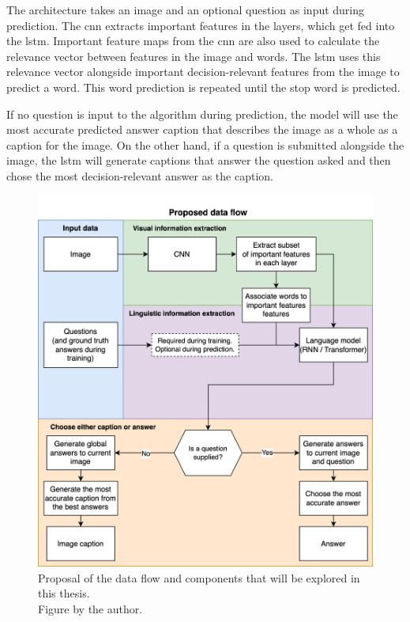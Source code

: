         The architecture takes an image and an optional question as input during prediction. The \gls{cnn} extracts important features in the layers, which get fed into the \gls{lstm}. Important feature maps from the \gls{cnn} are also used to calculate the relevance vector between features in the image and words. The \gls{lstm} uses this relevance vector alongside important decision-relevant features from the image to predict a word. This word prediction is repeated until the stop word is predicted. 
        
        If no question is input to the algorithm during prediction, the model will use the most accurate predicted answer caption that describes the image as a whole as a caption for the image. On the other hand, if a question is submitted alongside the image, the \gls{lstm} will generate captions that answer the question asked and then chose the most decision-relevant answer as the caption. 
        
        
        
        \begin{figure}[htb]
            \centering
            \includegraphics[width=\linewidth]{images/architecture_proposal.png}
            \caption{Proposal of the data flow and components that will be explored in this thesis.\\
            Figure by the author.
            }
            \label{fig:architecture_proposal}
        \end{figure}
                

